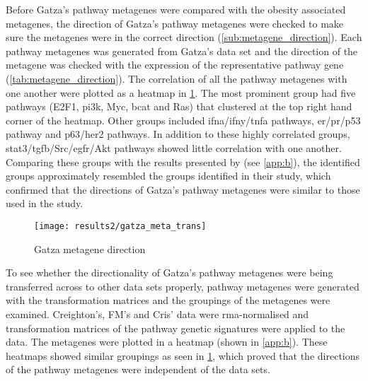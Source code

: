 Before Gatza's pathway metagenes were compared with the obesity associated metagenes, the direction of Gatza's pathway metagenes were checked to make sure the metagenes were in the correct direction (\cref{sub:metagene_direction}).
Each pathway metagenes was generated from Gatza's data set and the direction of the metagene was checked with the expression of the representative  pathway gene (\cref{tab:metagene_direction}).
The correlation of all the pathway metagenes with one another were plotted as a heatmap in \cref{fig:gatza_meta_dir}.
The most prominent group had five pathways (E2F1, \gls{pi3k}, Myc, \gls{bcat} and Ras) that clustered at the top right hand corner of the heatmap.
Other groups included \gls{ifna}/\gls{ifny}/\gls{tnfa} pathways, \gls{er}/\gls{pr}/p53 pathway and p63/\gls{her2} pathways.
In addition to these highly correlated groups, \gls{stat3}/\gls{tgfb}/Src/\gls{egfr}/Akt pathways showed little correlation with one another.
Comparing these groups with the results presented by \citet{Gatza2010a} (see \cref{app:b}), the identified groups approximately resembled the groups identified in their study, which confirmed that the directions of Gatza's pathway metagenes were similar to those used in the \citet{Gatza2010a} study.

\begin{figure}[htpb]
	\centering
	\texttt{[image: results2/gatza\_meta\_trans]}
	\caption{Gatza metagene direction}
	\label{fig:gatza_meta_dir}
\end{figure}

To see whether the directionality of Gatza's pathway metagenes were being transferred across to other data sets properly, pathway metagenes were generated with the transformation matrices and the groupings of the metagenes were examined.
Creighton's, FM's and Cris' data were \gls{rma}-normalised and transformation matrices of the pathway genetic signatures were applied to the data.
The metagenes were plotted in a heatmap (shown in \cref{app:b}).
These heatmaps showed similar groupings  as seen in \cref{fig:gatza_meta_dir}, which proved that the directions of the pathway metagenes were independent of the data sets.



